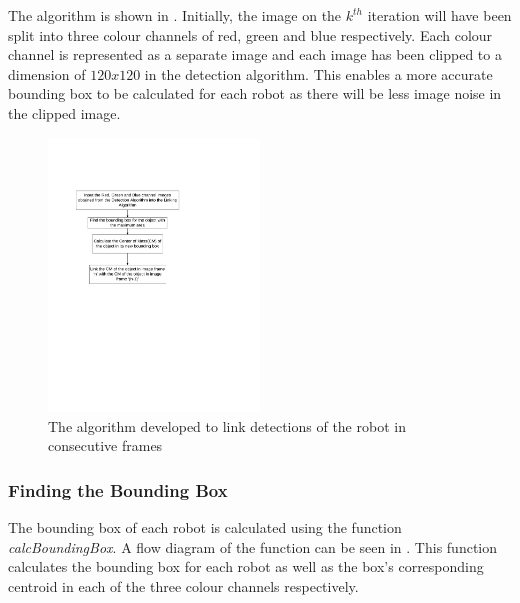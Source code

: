 \documentclass{article}
\begin{document}
The algorithm is shown in . Initially, the image on the $k^{th}$ iteration will have been split into three colour channels of red, green and blue respectively. Each colour channel is represented as a separate image and each image has been clipped to a dimension of $120x120$ in the detection algorithm. This enables a more accurate bounding box to be calculated for each robot as there will be less image noise in the clipped image.  \\


\begin{figure}[h!] 
  \centering
    \includegraphics[width=0.5\textwidth]{../Drawings/linkingAlgorithm.pdf}
    \caption{The algorithm developed to link detections of the robot in consecutive frames}
    \label{fig:link}
\end{figure}

\subsubsection{Finding the Bounding Box}
\label{sec:boundbox}

The bounding box of each robot is calculated using the function \textit{calcBoundingBox}. A flow diagram of the function can be seen in . This function calculates the bounding box for each robot as well as the box's corresponding centroid in each of the three colour channels respectively.
\end{document}
